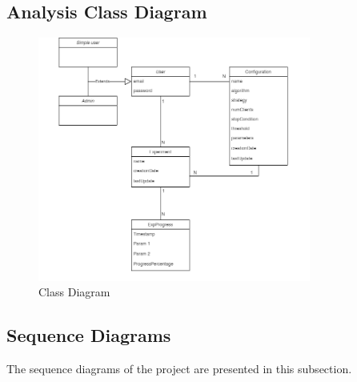 
\newpage
\subsection{Analysis Class Diagram}

\begin{figure}[ht!]
    \centering
    \includegraphics[width=0.8\textwidth]{images/2_analisys/FL_class_diag.png}
    \caption{Class Diagram}
    \label{fig:class_diagram}
\end{figure}

\subsection{Sequence Diagrams}

The sequence diagrams of the project are presented in this subsection.

